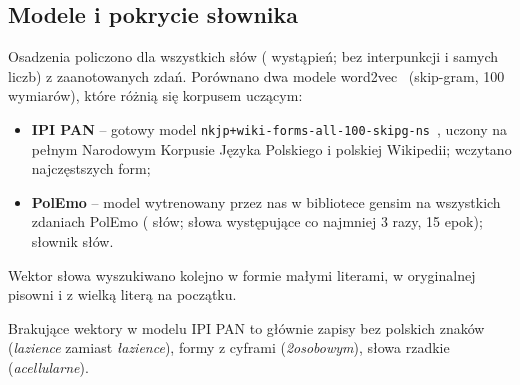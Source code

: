 \subsection{Modele i pokrycie słownika}\label{sec:we-models}

Osadzenia policzono dla wszystkich \weNWords{} słów (\weNTokens{} wystąpień; bez interpunkcji i samych liczb)
z \weNSentences{} zaanotowanych zdań. Porównano dwa modele word2vec~\cite{word2vec} (skip-gram, 100 wymiarów),
które różnią się korpusem uczącym:
\begin{itemize}
  \item \textbf{IPI PAN} -- gotowy model \texttt{nkjp+wiki-forms-all-100-skipg-ns}~\cite{dsmodels}, uczony na pełnym
        Narodowym Korpusie Języka Polskiego i polskiej Wikipedii; wczytano \weVocabIpi{} najczęstszych form;
  \item \textbf{PolEmo} -- model wytrenowany przez nas w bibliotece gensim na wszystkich \wePolemoSentences{} zdaniach
        PolEmo (\wePolemoWords{} słów; słowa występujące co najmniej 3 razy, 15 epok); słownik \weVocabPol{} słów.
\end{itemize}
Wektor słowa wyszukiwano kolejno w formie małymi literami, w oryginalnej pisowni i z wielką literą na początku.

\begin{table}[H]
\centering\small
{}
\caption{Pokrycie słownika: odsetek słów (wystąpień) zaanotowanego korpusu, dla których model ma wektor.
„Słowa zaanotowane'' -- z co najmniej jedną anotacją różną od O; kolumny etykiet -- słowa o danej etykiecie
(najczęstsza etykieta anotacji, jeśli co najmniej połowa anotacji słowa jest różna od O).}
\label{tab:we-coverage}
\end{table}

Brakujące wektory w modelu IPI PAN to głównie zapisy bez polskich znaków (\emph{lazience} zamiast \emph{łazience}), formy z cyframi (\emph{2osobowym}), słowa rzadkie (\emph{acellularne}).
